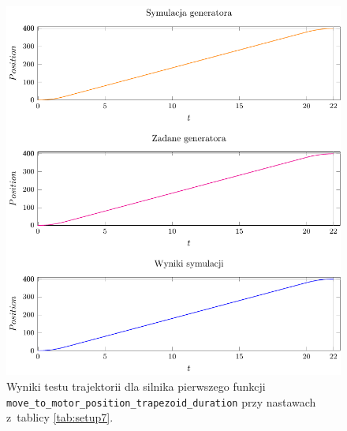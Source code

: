 \documentclass[a4paper, 12pt]{article}
\begin{document}
	\begin{figure}[H]
		\centering
		\includegraphics[scale=1.2]{raport_graphs/simpMPD.pdf}
		\caption{Wyniki testu trajektorii dla silnika pierwszego funkcji \texttt{move\_to\_motor\_position\_trapezoid\_duration} przy nastawach z~tablicy \ref{tab:setup7}.}
		\label{fig:simpMPD}
	\end{figure}
\end{document}
